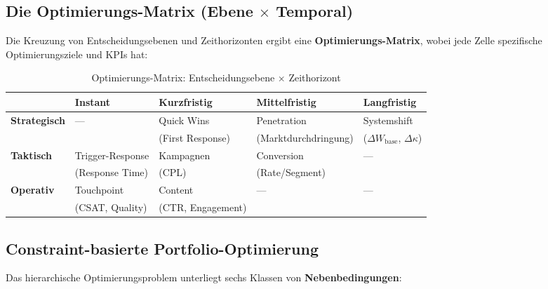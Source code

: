 \subsection{Die Optimierungs-Matrix (Ebene $\times$ Temporal)}
\label{sec:20-optimization-matrix}

Die Kreuzung von Entscheidungsebenen und Zeithorizonten ergibt eine \textbf{Optimierungs-Matrix}, wobei jede Zelle spezifische Optimierungsziele und KPIs hat:

\begin{table}[htbp]
\centering
\caption{Optimierungs-Matrix: Entscheidungsebene $\times$ Zeithorizont}
\label{tab:20-optimization-matrix}
\renewcommand{\arraystretch}{1.5}
\small
\begin{tabular}{@{}l|llll@{}}
\toprule
& \textbf{Instant} & \textbf{Kurzfristig} & \textbf{Mittelfristig} & \textbf{Langfristig} \\
\midrule
\textbf{Strategisch} & --- & Quick Wins & Penetration & Systemshift \\
& & (First Response) & (Marktdurchdringung) & ($\Delta W_{\text{base}}$, $\Delta\kappa$) \\
\midrule
\textbf{Taktisch} & Trigger-Response & Kampagnen & Conversion & --- \\
& (Response Time) & (CPL) & (Rate/Segment) & \\
\midrule
\textbf{Operativ} & Touchpoint & Content & --- & --- \\
& (CSAT, Quality) & (CTR, Engagement) & & \\
\bottomrule
\end{tabular}
\end{table}

\subsection{Constraint-basierte Portfolio-Optimierung}
\label{sec:20-constraint-optimization}

Das hierarchische Optimierungsproblem unterliegt sechs Klassen von \textbf{Nebenbedingungen}:

